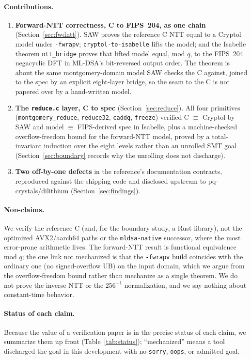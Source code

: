 \documentclass[11pt]{article}
\newcommand{\code}[1]{\texttt{#1}}
\begin{document}
\paragraph{Contributions.}
\begin{enumerate}
  \item \textbf{Forward-NTT correctness, C to FIPS~204, as one chain} (Section~\ref{sec:fwdntt}). SAW
  proves the reference C NTT equal to a Cryptol model under \code{-fwrapv}; \code{cryptol-to-isabelle}
  lifts the model; and the Isabelle theorem \code{ntt\_bridge} proves that lifted model equal, mod $q$,
  to the FIPS~204 negacyclic DFT in ML-DSA's bit-reversed output order. The theorem is about the same
  montgomery-domain model SAW checks the C against, joined to the spec by an explicit eight-layer bridge,
  so the seam to the C is not papered over by a hand-written model.
  \item \textbf{The \code{reduce.c} layer, C to spec} (Section~\ref{sec:reduce}). All four primitives
  (\code{montgomery\_reduce}, \code{reduce32}, \code{caddq}, \code{freeze}) verified C $\equiv$ Cryptol by
  SAW and model $\equiv$ FIPS-derived spec in Isabelle, plus a machine-checked overflow-freedom bound for
  the forward-NTT model, proved by a total-invariant induction over the eight levels rather than an
  unrolled SMT goal (Section~\ref{sec:boundary} records why the unrolling does not discharge).
  \item \textbf{Two off-by-one defects} in the reference's documentation contracts, reproduced against
  the shipping code and disclosed upstream to pq-crystals/dilithium (Section~\ref{sec:findings}).
\end{enumerate}

\paragraph{Non-claims.} We verify the reference C (and, for the boundary study, a Rust library), not the
optimized AVX2/aarch64 paths or the \code{mldsa-native} successor, where the most error-prone arithmetic
lives. The forward-NTT result is functional equivalence mod $q$; the one link not mechanized is that the
\code{-fwrapv} build coincides with the ordinary one (no signed-overflow UB) on the input domain, which
we argue from the overflow-freedom bound rather than mechanize as a single theorem. We do not prove the
inverse NTT or the $256^{-1}$ normalization, and we say nothing about constant-time behavior.

\paragraph{Status of each claim.} Because the value of a verification paper is in the precise status of
each claim, we summarize them up front (Table~\ref{tab:status}); ``mechanized'' means a tool discharged
the goal in this development with no \code{sorry}, \code{oops}, or admitted goal.
\end{document}
